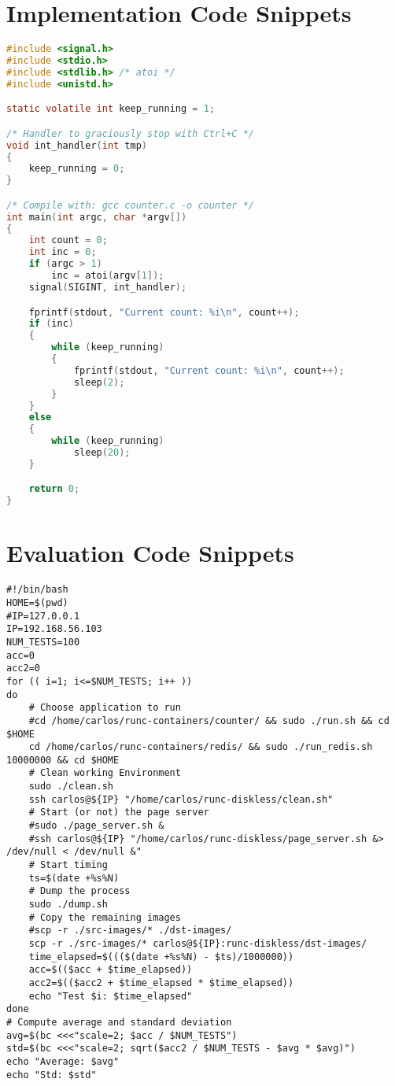 \chapter{Implementation Code Snippets} \label{chap:app-code}

\begin{lstlisting}[language=C,caption={Simple counter in C.},label={code:c-counter}]
#include <signal.h>
#include <stdio.h>
#include <stdlib.h> /* atoi */
#include <unistd.h>

static volatile int keep_running = 1;

/* Handler to graciously stop with Ctrl+C */
void int_handler(int tmp)
{
    keep_running = 0;
}

/* Compile with: gcc counter.c -o counter */
int main(int argc, char *argv[])
{
    int count = 0;
    int inc = 0;
    if (argc > 1)
        inc = atoi(argv[1]);
    signal(SIGINT, int_handler);

    fprintf(stdout, "Current count: %i\n", count++);
    if (inc)
    {
        while (keep_running)
        {
            fprintf(stdout, "Current count: %i\n", count++);
            sleep(2);
        }
    }
    else 
    {
        while (keep_running)
            sleep(20);
    }

    return 0;
}
\end{lstlisting}

\chapter{Evaluation Code Snippets} \label{chap:app:evaluation}

\begin{lstlisting}[style=Bash,caption={Full evaluation script for the diskless migration micro-benchmark using. \label{code:microbenchmark-diskless-evaluation}}]
#!/bin/bash
HOME=$(pwd)
#IP=127.0.0.1
IP=192.168.56.103
NUM_TESTS=100
acc=0
acc2=0
for (( i=1; i<=$NUM_TESTS; i++ ))
do
    # Choose application to run
    #cd /home/carlos/runc-containers/counter/ && sudo ./run.sh && cd $HOME
    cd /home/carlos/runc-containers/redis/ && sudo ./run_redis.sh 10000000 && cd $HOME
    # Clean working Environment
    sudo ./clean.sh
    ssh carlos@${IP} "/home/carlos/runc-diskless/clean.sh"
    # Start (or not) the page server
    #sudo ./page_server.sh &
    #ssh carlos@${IP} "/home/carlos/runc-diskless/page_server.sh &> /dev/null < /dev/null &"
    # Start timing
    ts=$(date +%s%N)
    # Dump the process
    sudo ./dump.sh
    # Copy the remaining images
    #scp -r ./src-images/* ./dst-images/
    scp -r ./src-images/* carlos@${IP}:runc-diskless/dst-images/
    time_elapsed=$((($(date +%s%N) - $ts)/1000000))
    acc=$(($acc + $time_elapsed))
    acc2=$(($acc2 + $time_elapsed * $time_elapsed))
    echo "Test $i: $time_elapsed"
done
# Compute average and standard deviation
avg=$(bc <<<"scale=2; $acc / $NUM_TESTS")
std=$(bc <<<"scale=2; sqrt($acc2 / $NUM_TESTS - $avg * $avg)")
echo "Average: $avg"
echo "Std: $std"
\end{lstlisting}

